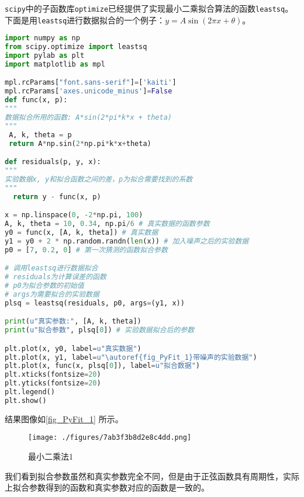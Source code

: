 \verb`scipy`中的子函数库\verb`optimize`已经提供了实现最小二乘拟合算法的函数\verb`leastsq`。下面是用\verb`leastsq`进行数据拟合的一个例子：$y=A\sin(2\pi x+\theta)$。
\begin{lstlisting}[language=python]
import numpy as np
from scipy.optimize import leastsq
import pylab as plt
import matplotlib as mpl

mpl.rcParams["font.sans-serif"]=['kaiti']
mpl.rcParams['axes.unicode_minus']=False
def func(x, p):
"""
数据拟合所用的函数: A*sin(2*pi*k*x + theta)
"""
 A, k, theta = p
 return A*np.sin(2*np.pi*k*x+theta)

def residuals(p, y, x):
"""
实验数据x, y和拟合函数之间的差，p为拟合需要找到的系数
"""
  return y - func(x, p)

x = np.linspace(0, -2*np.pi, 100)
A, k, theta = 10, 0.34, np.pi/6 # 真实数据的函数参数
y0 = func(x, [A, k, theta]) # 真实数据
y1 = y0 + 2 * np.random.randn(len(x)) # 加入噪声之后的实验数据
p0 = [7, 0.2, 0] # 第一次猜测的函数拟合参数

# 调用leastsq进行数据拟合
# residuals为计算误差的函数
# p0为拟合参数的初始值
# args为需要拟合的实验数据
plsq = leastsq(residuals, p0, args=(y1, x))

print(u"真实参数:", [A, k, theta])
print(u"拟合参数", plsq[0]) # 实验数据拟合后的参数

plt.plot(x, y0, label=u"真实数据")
plt.plot(x, y1, label=u"\autoref{fig_PyFit_1}带噪声的实验数据")
plt.plot(x, func(x, plsq[0]), label=u"拟合数据")
plt.xticks(fontsize=20)
plt.yticks(fontsize=20)
plt.legend()
plt.show()
\end{lstlisting}
结果图像如\autoref{fig_PyFit_1} 所示。
\begin{figure}[ht]
\centering
\texttt{[image: ./figures/7ab3f3b8d2e8c4dd.png]}
\caption{最小二乘法1} \label{fig_PyFit_1}
\end{figure}

我们看到拟合参数虽然和真实参数完全不同，但是由于正弦函数具有周期性，实际上拟合参数得到的函数和真实参数对应的函数是一致的。

